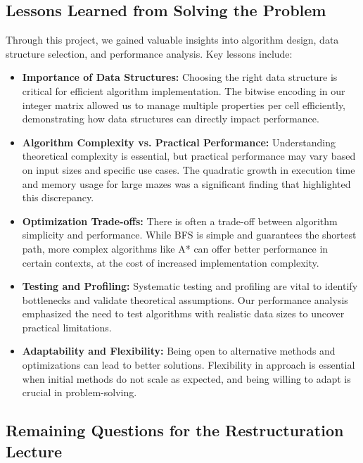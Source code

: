\documentclass{article}
\begin{document}
\subsection*{Lessons Learned from Solving the Problem}

Through this project, we gained valuable insights into algorithm design, data structure selection, and performance analysis. Key lessons include:

\begin{itemize}
    \item \textbf{Importance of Data Structures:} Choosing the right data structure is critical for efficient algorithm implementation. The bitwise encoding in our integer matrix allowed us to manage multiple properties per cell efficiently, demonstrating how data structures can directly impact performance.

    \item \textbf{Algorithm Complexity vs. Practical Performance:} Understanding theoretical complexity is essential, but practical performance may vary based on input sizes and specific use cases. The quadratic growth in execution time and memory usage for large mazes was a significant finding that highlighted this discrepancy.

    \item \textbf{Optimization Trade-offs:} There is often a trade-off between algorithm simplicity and performance. While BFS is simple and guarantees the shortest path, more complex algorithms like A* can offer better performance in certain contexts, at the cost of increased implementation complexity.

    \item \textbf{Testing and Profiling:} Systematic testing and profiling are vital to identify bottlenecks and validate theoretical assumptions. Our performance analysis emphasized the need to test algorithms with realistic data sizes to uncover practical limitations.

    \item \textbf{Adaptability and Flexibility:} Being open to alternative methods and optimizations can lead to better solutions. Flexibility in approach is essential when initial methods do not scale as expected, and being willing to adapt is crucial in problem-solving.

\end{itemize}

\subsection*{Remaining Questions for the Restructuration Lecture}
\end{document}
